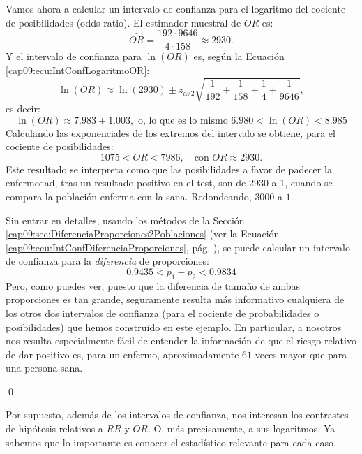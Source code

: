 \begin{ejemplo}
Vamos ahora a calcular un intervalo de confianza para el logaritmo del cociente de posibilidades (odds ratio). El estimador muestral de $OR$ es:
\[\widehat{OR} = \dfrac{192\cdot 9646}{4\cdot 158}\approx 2930.\]
Y el intervalo de confianza para $\ln(OR)$ es, según la Ecuación \ref{cap09:ecu:IntConfLogaritmoOR}:
\[
        \ln(OR)\approx
        \ln\left(2930\right)\pm z_{\alpha/2}
        \sqrt{\dfrac{1}{192}+\dfrac{1}{158}+\dfrac{1}{4}+\dfrac{1}{9646}},
\]
es decir:
\[
\ln(OR)\approx 7.983\pm 1.003,\mbox{ o, lo que es lo mismo } 6.980<\ln(OR)<8.985
\]
Calculando las exponenciales de los extremos del intervalo se obtiene, para el cociente de posibilidades:
\[1075< OR < 7986, \quad \mbox {con } OR\approx 2930.\]
Este resultado se interpreta como que las posibilidades a favor de padecer la enfermedad, tras un resultado positivo en el test, son de 2930 a 1, cuando se compara la población enferma con la sana.  Redondeando, $3000$ a $1$.

Sin entrar en detalles, usando los métodos de la Sección \ref{cap09:sec:DiferenciaProporciones2Poblaciones} (ver la Ecuación \ref{cap09:ecu:IntConfDiferenciaProporciones}, pág. \pageref{cap09:ecu:IntConfDiferenciaProporciones}), se puede calcular un intervalo de confianza para la {\em diferencia} de proporciones:
\[0.9435 < p_1-p_2 <0.9834\]
Pero, como puedes ver, puesto que la diferencia de tamaño de ambas proporciones es tan grande, seguramente resulta más informativo cualquiera de los otros dos intervalos de confianza (para el cociente de probabilidades o posibilidades) que hemos construido en este ejemplo. En particular, a nosotros nos resulta especialmente fácil de entender la información de que el riesgo relativo de dar positivo es, para un enfermo, aproximadamente $61$ veces mayor que para una persona sana.

\qed
\end{ejemplo}

Por supuesto, además de los intervalos de confianza, nos interesan los contrastes de hipótesis relativos a $RR$ y $OR$. O, más precisamente, a sus logaritmos. Ya sabemos que lo importante es conocer el estadístico relevante para cada caso.

